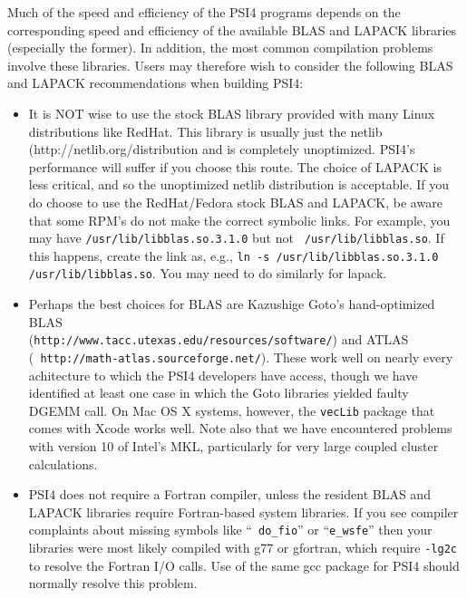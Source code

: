 \documentclass[12pt]{article}
\begin{document}
Much of the speed and efficiency of the PSI4 programs depends on the
corresponding speed and efficiency of the available BLAS and LAPACK
libraries (especially the former).  In addition, the most common
compilation problems involve these libraries.  Users may therefore
wish to consider the following BLAS and LAPACK recommendations when
building PSI4:

\begin{itemize}
\item It is NOT wise to use the stock BLAS library provided with many
  Linux distributions like RedHat.  This library is usually just the
  netlib ({http://netlib.org/}distribution and is completely
  unoptimized.  PSI4's performance will suffer if you choose this
  route.  The choice of LAPACK is less critical, and so the
  unoptimized netlib distribution is acceptable.  If you do choose to
  use the RedHat/Fedora stock BLAS and LAPACK, be aware that some
  RPM's do not make the correct symbolic links.  For example, you may
  have {\tt /usr/lib/libblas.so.3.1.0} but not {\tt
    /usr/lib/libblas.so}.  If this happens, create the link as, e.g.,
  {\tt ln -s /usr/lib/libblas.so.3.1.0 /usr/lib/libblas.so}.  You may
  need to do similarly for lapack.

\item Perhaps the best choices for BLAS are Kazushige Goto's
  hand-optimized BLAS \\
({\tt http://www.tacc.utexas.edu/resources/software/}) and ATLAS \\ ({\tt
http://math-atlas.sourceforge.net/}).  These work well on nearly
  every achitecture to which the PSI4 developers have access, though we have
  identified at least one case in which the Goto libraries yielded faulty
  DGEMM call.  On Mac OS X systems, however, the {\tt vecLib} package that
  comes with Xcode works well. Note also that we have encountered problems
  with version 10 of Intel's MKL, particularly for very large coupled
  cluster calculations.

\item PSI4 does not require a Fortran compiler, unless the resident
  BLAS and LAPACK libraries require Fortran-based system libraries.
  If you see compiler complaints about missing symbols like ``{\tt
    do\_fio}'' or ``{\tt e\_wsfe}'' then your libraries were most likely
  compiled with g77 or gfortran, which require {\tt -lg2c} to resolve
  the Fortran I/O calls.  Use of the same gcc package for PSI4 should
  normally resolve this problem.


\end{itemize}
\end{document}
